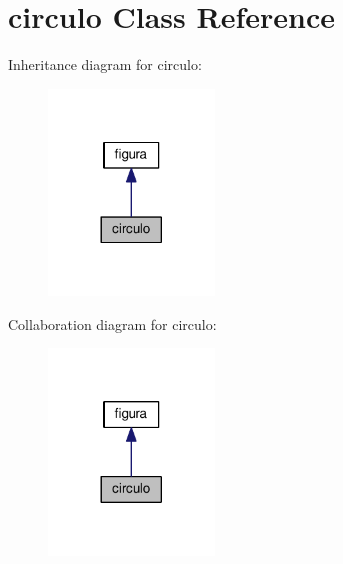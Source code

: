 \hypertarget{classcirculo}{}\section{circulo Class Reference}
\label{classcirculo}


Inheritance diagram for circulo\+:\nopagebreak
\begin{figure}[H]
\begin{center}
\leavevmode
\includegraphics[width=125pt]{classcirculo__inherit__graph}
\end{center}
\end{figure}


Collaboration diagram for circulo\+:\nopagebreak
\begin{figure}[H]
\begin{center}
\leavevmode
\includegraphics[width=125pt]{classcirculo__coll__graph}
\end{center}
\end{figure}
